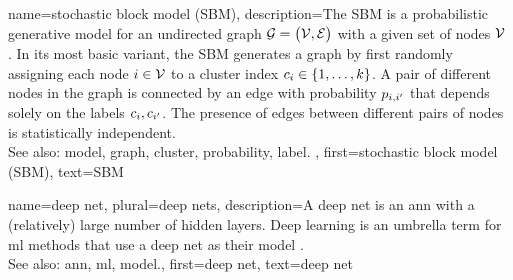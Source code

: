 {name={stochastic block model (SBM)},
	description={The SBM is a 
		probabilistic generative \gls{model} for an undirected \gls{graph} $\mathcal{G} = \big( \mathcal{V}, \mathcal{E} \big)$ 
		with a given set of nodes $\mathcal{V}$ \cite{AbbeSBM2018}. In its most basic variant, 
		the SBM generates a \gls{graph} by first randomly assigning each node $i \in \mathcal{V}$ to 
		a \gls{cluster} index $c_{i} \in \{1, \ldots, k\}$. A pair of different nodes in the 
		\gls{graph} is connected by an edge with \gls{probability} $p_{i,i'}$ that depends 
		solely on the \glspl{label} $c_{i}, c_{i'}$. 
		The presence of edges between different pairs of 
		nodes is statistically independent.
					\\ 
		See also: \gls{model}, \gls{graph}, \gls{cluster}, \gls{probability}, \gls{label}. },
	first={stochastic block model (SBM)},
	text={SBM} 
}

{name={deep net}, plural={deep nets},
	description={A deep net is an \gls{ann} with a (relatively) large number of 
		hidden layers. Deep learning is an umbrella term for \gls{ml} methods that use a deep 
		net as their \gls{model} \cite{Goodfellow-et-al-2016}.
				\\ 
		See also: \gls{ann}, \gls{ml}, \gls{model}.},
	first={deep net},
	text={deep net} 
}

\newcommand{\gaussiancenter}{3}

